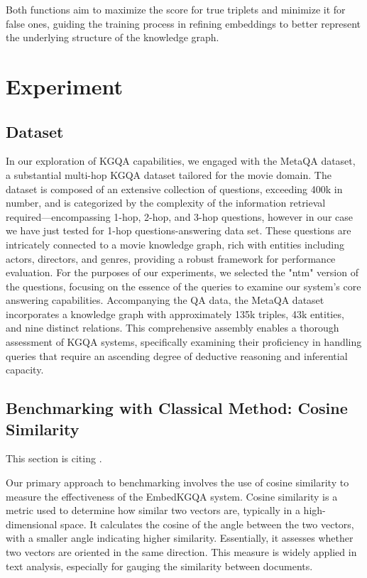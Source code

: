 \documentclass{article}
\begin{document}
Both functions aim to maximize the score for true triplets and minimize it for false ones, guiding the training process in refining embeddings to better represent the underlying structure of the knowledge graph.


\section{Experiment}
\subsection{Dataset}
\sloppy
In our exploration of KGQA capabilities, we engaged with the MetaQA \parencite[]{zhang2017variational} dataset, a substantial multi-hop KGQA dataset tailored for the movie domain. The dataset is composed of an extensive collection of questions, exceeding 400k in number, and is categorized by the complexity of the information retrieval required—encompassing 1-hop, 2-hop, and 3-hop questions, however in our case we have just tested for 1-hop questions-answering data set. These questions are intricately connected to a movie knowledge graph, rich with entities including actors, directors, and genres, providing a robust framework for performance evaluation. 
\sloppy
For the purposes of our experiments, we selected the "ntm" version of the questions, focusing on the essence of the queries to examine our system’s core answering capabilities. Accompanying the QA data, the MetaQA dataset incorporates a knowledge graph with approximately 135k triples, 43k entities, and nine distinct relations. This comprehensive assembly enables a thorough assessment of KGQA systems, specifically examining their proficiency in handling queries that require an ascending degree of deductive reasoning and inferential capacity.

\subsection{Benchmarking with Classical Method: Cosine Similarity}
This section is citing \textcite{ganesan2024automated}.

Our primary approach to benchmarking involves the use of cosine similarity to measure the effectiveness of the EmbedKGQA system. Cosine similarity is a metric used to determine how similar two vectors are, typically in a high-dimensional space. It calculates the cosine of the angle between the two vectors, with a smaller angle indicating higher similarity. Essentially, it assesses whether two vectors are oriented in the same direction. This measure is widely applied in text analysis, especially for gauging the similarity between documents.
\end{document}
